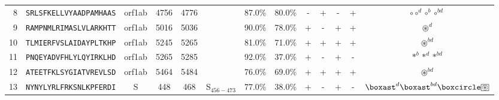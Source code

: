 \begin{tabular}{rcccccccccccc}
8  &  \texttt{SRLSFKELLVYAADPAMHAAS} &  orf1ab &   4756 &  4776 &                &                          87.0\% &                           80.0\% &          - &           + &          - &           + &                                                   $ \circ \circ^d \circ^b \circ^{bd} $ \\
9  &  \texttt{RAMPNMLRIMASLVLARKHTT} &  orf1ab &   5016 &  5036 &                &                          90.0\% &                           78.0\% &          + &           - &          + &           + &                                                                      $ \circledast^d $ \\
10 &  \texttt{TLMIERFVSLAIDAYPLTKHP} &  orf1ab &   5245 &  5265 &                &                          81.0\% &                           71.0\% &          + &           + &          + &           + &                                                                   $ \circledast^{bd} $ \\
11 &  \texttt{PNQEYADVFHLYLQYIRKLHD} &  orf1ab &   5265 &  5285 &                &                          92.0\% &                           37.0\% &          + &           - &          + &           - &                                                            $ \ast^b \ast^d \ast^{bd} $ \\
12 &  \texttt{ATEETFKLSYGIATVREVLSD} &  orf1ab &   5464 &  5484 &                &                          76.0\% &                           69.0\% &          + &           + &          + &           + &                                                                   $ \circledast^{bd} $ \\
13 &  \texttt{NYNYLYRLFRKSNLKPFERDI} &       S &    448 &   468 &  S$_{456-473}$ &                          77.0\% &                           38.0\% &          + &           - &          + &           - &  $ \boxast^d \boxast^{bd} \boxcircle \setlength{\fboxsep}{0.5pt} \boxed{\circledast} $ \\
\bottomrule
\end{tabular}
